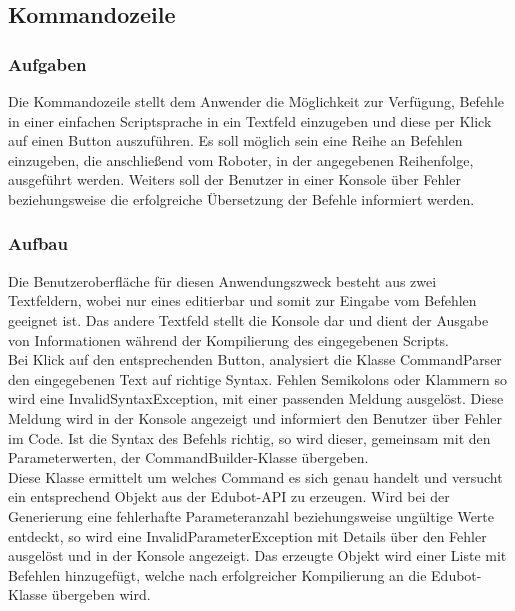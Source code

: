 
\subsection{Kommandozeile}

\subsubsection{Aufgaben}
Die Kommandozeile stellt dem Anwender die Möglichkeit zur Verfügung, Befehle in einer einfachen Scriptsprache in ein Textfeld einzugeben und diese per Klick auf einen Button auszuführen. Es soll möglich sein eine Reihe an Befehlen einzugeben, die anschließend vom Roboter, in der angegebenen Reihenfolge, ausgeführt werden. Weiters soll der Benutzer in einer Konsole über Fehler beziehungsweise die erfolgreiche Übersetzung der Befehle informiert werden.

\subsubsection{Aufbau}
Die Benutzeroberfläche für diesen Anwendungszweck besteht aus zwei Textfeldern, wobei nur eines editierbar und somit zur Eingabe vom Befehlen geeignet ist. Das andere Textfeld stellt die Konsole dar und dient der Ausgabe von Informationen während der Kompilierung des eingegebenen Scripts. \\
Bei Klick auf den entsprechenden Button, analysiert die Klasse CommandParser den eingegebenen Text auf richtige Syntax. Fehlen Semikolons oder Klammern so wird eine InvalidSyntaxException, mit einer passenden Meldung ausgelöst. Diese Meldung wird in der Konsole angezeigt und informiert den Benutzer über Fehler im Code. Ist die Syntax des Befehls richtig, so wird dieser, gemeinsam mit den Parameterwerten, der CommandBuilder-Klasse übergeben.\\
Diese Klasse ermittelt um welches Command es sich genau handelt und versucht ein entsprechend Objekt aus der Edubot-API zu erzeugen. Wird bei der Generierung eine fehlerhafte Parameteranzahl beziehungsweise ungültige Werte entdeckt, so wird eine InvalidParameterException mit Details über den Fehler ausgelöst und in der Konsole angezeigt. Das erzeugte Objekt wird einer Liste mit Befehlen hinzugefügt, welche nach erfolgreicher Kompilierung an die Edubot-Klasse übergeben wird.

